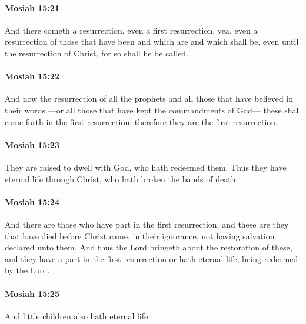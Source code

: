 		\paragraph{Mosiah 15:21} %
			\label{MOSIAH-15-21}

			And there cometh a resurrection,
			even a first resurrection,
			yea, even a resurrection of those
			that have been and which are and which shall be,
			even until the resurrection of Christ,
			for so shall he be called.

		\paragraph{Mosiah 15:22} %
			\label{MOSIAH-15-22}

			And now the resurrection of all the prophets
			and all those that have believed in their words
			---or all those that have kept the commandments of God---
			these shall come forth in the first resurrection;
			therefore they are the first resurrection.

		\paragraph{Mosiah 15:23} %
			\label{MOSIAH-15-23}

			They are raised to dwell with God, who hath redeemed them.
			Thus they have eternal life through Christ,
			who hath broken the bands of death.

		\paragraph{Mosiah 15:24} %
			\label{MOSIAH-15-24}

			And there are those who have part in the first resurrection,
			and these are they that have died before Christ came,
			in their ignorance,
			not having salvation declared unto them.
			And thus the Lord bringeth about the restoration of these,
			and they have a part in the first resurrection or hath eternal life,
			being redeemed by the Lord.

		\paragraph{Mosiah 15:25} %
			\label{MOSIAH-15-25}

			And little children also hath eternal life.

